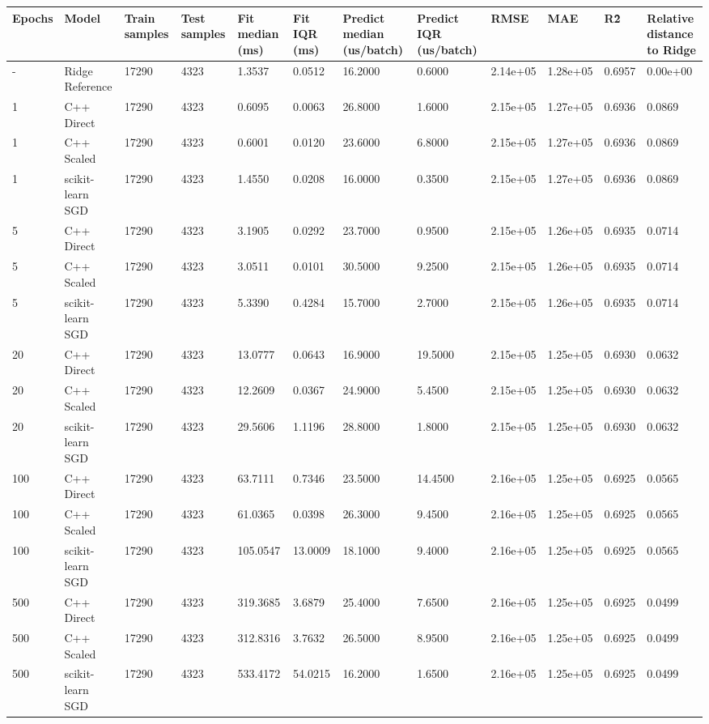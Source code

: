 \begin{table}[htbp]
\centering
\begin{tabular}{llllllllllll}
\toprule
Epochs & Model & Train samples & Test samples & Fit median (ms) & Fit IQR (ms) & Predict median (us/batch) & Predict IQR (us/batch) & RMSE & MAE & R\^2 & Relative distance to Ridge \\
\midrule
- & Ridge Reference & 17290 & 4323 & 1.3537 & 0.0512 & 16.2000 & 0.6000 & 2.14e+05 & 1.28e+05 & 0.6957 & 0.00e+00 \\
1 & C++ Direct & 17290 & 4323 & 0.6095 & 0.0063 & 26.8000 & 1.6000 & 2.15e+05 & 1.27e+05 & 0.6936 & 0.0869 \\
1 & C++ Scaled & 17290 & 4323 & 0.6001 & 0.0120 & 23.6000 & 6.8000 & 2.15e+05 & 1.27e+05 & 0.6936 & 0.0869 \\
1 & scikit-learn SGD & 17290 & 4323 & 1.4550 & 0.0208 & 16.0000 & 0.3500 & 2.15e+05 & 1.27e+05 & 0.6936 & 0.0869 \\
5 & C++ Direct & 17290 & 4323 & 3.1905 & 0.0292 & 23.7000 & 0.9500 & 2.15e+05 & 1.26e+05 & 0.6935 & 0.0714 \\
5 & C++ Scaled & 17290 & 4323 & 3.0511 & 0.0101 & 30.5000 & 9.2500 & 2.15e+05 & 1.26e+05 & 0.6935 & 0.0714 \\
5 & scikit-learn SGD & 17290 & 4323 & 5.3390 & 0.4284 & 15.7000 & 2.7000 & 2.15e+05 & 1.26e+05 & 0.6935 & 0.0714 \\
20 & C++ Direct & 17290 & 4323 & 13.0777 & 0.0643 & 16.9000 & 19.5000 & 2.15e+05 & 1.25e+05 & 0.6930 & 0.0632 \\
20 & C++ Scaled & 17290 & 4323 & 12.2609 & 0.0367 & 24.9000 & 5.4500 & 2.15e+05 & 1.25e+05 & 0.6930 & 0.0632 \\
20 & scikit-learn SGD & 17290 & 4323 & 29.5606 & 1.1196 & 28.8000 & 1.8000 & 2.15e+05 & 1.25e+05 & 0.6930 & 0.0632 \\
100 & C++ Direct & 17290 & 4323 & 63.7111 & 0.7346 & 23.5000 & 14.4500 & 2.16e+05 & 1.25e+05 & 0.6925 & 0.0565 \\
100 & C++ Scaled & 17290 & 4323 & 61.0365 & 0.0398 & 26.3000 & 9.4500 & 2.16e+05 & 1.25e+05 & 0.6925 & 0.0565 \\
100 & scikit-learn SGD & 17290 & 4323 & 105.0547 & 13.0009 & 18.1000 & 9.4000 & 2.16e+05 & 1.25e+05 & 0.6925 & 0.0565 \\
500 & C++ Direct & 17290 & 4323 & 319.3685 & 3.6879 & 25.4000 & 7.6500 & 2.16e+05 & 1.25e+05 & 0.6925 & 0.0499 \\
500 & C++ Scaled & 17290 & 4323 & 312.8316 & 3.7632 & 26.5000 & 8.9500 & 2.16e+05 & 1.25e+05 & 0.6925 & 0.0499 \\
500 & scikit-learn SGD & 17290 & 4323 & 533.4172 & 54.0215 & 16.2000 & 1.6500 & 2.16e+05 & 1.25e+05 & 0.6925 & 0.0499 \\
\bottomrule
\end{tabular}
\end{table}
